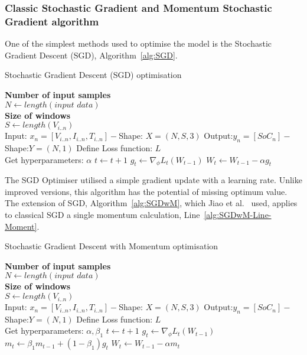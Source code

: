 \subsubsection{Classic Stochastic Gradient and Momentum Stochastic Gradient algorithm}
One of the simplest methods used to optimise the model is the Stochastic Gradient Descent (SGD), \mbox{Algorithm~\ref{alg:SGD}}.
\begin{algorithm}
  \caption{Stochastic Gradient Descent (SGD) optimisation}
  \begin{algorithmic}[1]
    \STATE \textbf{Number of input samples} \\ $N\gets length(\textit{input data})$\\
    \STATE \textbf{Size of windows} \\ $S\gets length(V_{i..n})$\\
    \STATE Input: $x_n = [V_{i..n}, I_{i..n}, T_{i..n}] - $Shape: $X = (N, S, 3)$
    \STATE Output:$y_n = [SoC_{n}] - $Shape:$Y = (N, 1)$
    \STATE Define Loss function: $L$ \\
           Get hyperparameters: $\alpha$
    \STATE $t \gets t+1$
    \STATE $g_t \gets \nabla_\phi L_t (W_{t-1})$ 
    \STATE $W_t \gets W_{t-1} - \alpha g_t $ 
    \ENDWHILE
  \end{algorithmic}
  \label{alg:SGD}
\end{algorithm}
The SGD Optimiser utilised a simple gradient update with a learning rate.
Unlike improved versions, this algorithm has the potential of missing optimum value.
The extension of SGD, Algorithm~\ref{alg:SGDwM}, which Jiao et al.~\cite{jiao_gru-rnn_2020} used, applies to classical SGD a single momentum calculation, Line~\ref{alg:SGDwM-Line-Moment}.
\begin{algorithm}
  \caption{Stochastic Gradient Descent with Momentum optimisation}
  \begin{algorithmic}[1]
    \STATE \textbf{Number of input samples} \\ $N\gets length(\textit{input data})$\\
    \STATE \textbf{Size of windows} \\ $S\gets length(V_{i..n})$\\
    \STATE Input: $x_n = [V_{i..n}, I_{i..n}, T_{i..n}] - $Shape: $X = (N, S, 3)$
    \STATE Output:$y_n = [SoC_{n}] - $Shape:$Y = (N, 1)$
    \STATE Define Loss function: $L$ \\
           Get hyperparameters: $\alpha, \beta_1$
    \STATE $t \gets t+1$
    \STATE $g_t \gets \nabla_\phi L_t (W_{t-1})$ 
    \STATE $m_t \gets \beta_1 m_{t-1}+(1-\beta_1) g_t $ 
    \STATE $W_t \gets W_{t-1} - \alpha m_t $  
    \ENDWHILE
  \end{algorithmic}
  \label{alg:SGDwM}
\end{algorithm}


